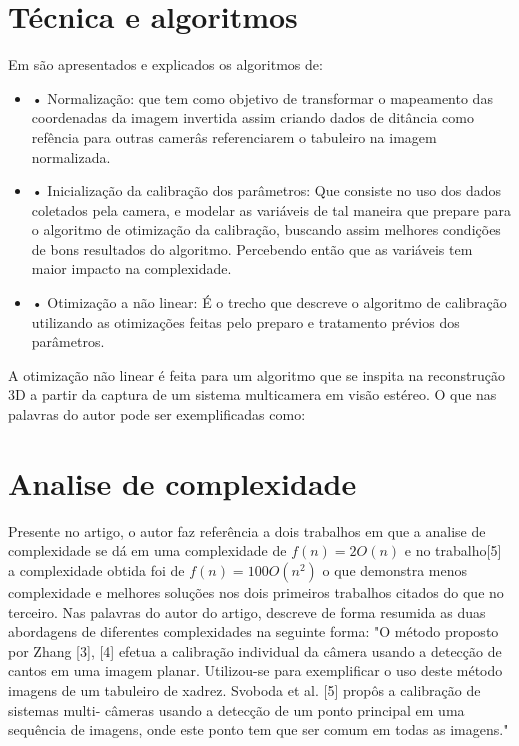 \documentclass[portuguese]{sbrt}
\begin{document}
\section{Técnica e algoritmos} 
\label{sec:tecnica_e_algoritmos}
Em \cite{MadalenaMenotti} são apresentados e explicados os algoritmos de:
\begin{itemize}
  \newline
  \item • Normalização: que tem como objetivo de transformar o mapeamento das coordenadas da imagem invertida assim criando dados de ditância como refência para outras camerâs referenciarem o tabuleiro na imagem normalizada.
  \newline
  \item • Inicialização da calibração dos parâmetros: Que consiste no uso dos dados coletados pela camera, e modelar as variáveis de tal maneira que prepare para o algoritmo de otimização da calibração, buscando assim melhores condições de bons resultados do algoritmo. Percebendo então que as variáveis tem maior impacto na complexidade.
  \newline
  \item • Otimização a não linear: É o trecho que descreve o algoritmo de calibração utilizando as otimizações feitas pelo preparo e tratamento prévios dos parâmetros.   
\end{itemize}
\newline
A otimização não linear é feita para um algoritmo que se inspita na reconstrução 3D a partir da captura de um sistema multicamera em visão estéreo. O que nas palavras do autor pode ser exemplificadas como: \cite["... Por exemplo, se deseja obter todos os pontos do corpo humano, quanto maior o número de câmeras utilizadas, mais preciso será a representação requerida."]{MadalenaMenotti}

\section{Analise de complexidade}
\label{sec:analise_complexidade}
Presente no artigo, o autor faz referência a dois trabalhos\cite{Zhang} em que a analise de complexidade se dá em uma complexidade de $f(n) = 2O(n)$ e no trabalho[5]\cite{Svoboda} a complexidade obtida foi de $f(n) = 100O(n^2)$ o que demonstra menos complexidade e melhores soluções nos dois primeiros trabalhos citados do que no terceiro. Nas palavras do autor do artigo, descreve de forma resumida as duas abordagens de diferentes complexidades na seguinte forma: "O método proposto por Zhang [3], [4] efetua a calibração
individual da câmera usando a detecção de cantos em uma
imagem planar. Utilizou-se para exemplificar o uso deste
método imagens de um tabuleiro de xadrez.
Svoboda et al. [5] propôs a calibração de sistemas multi-
câmeras usando a detecção de um ponto principal em uma
sequência de imagens, onde este ponto tem que ser comum
em todas as imagens." \cite{MadalenaMenotti}
\end{document}
